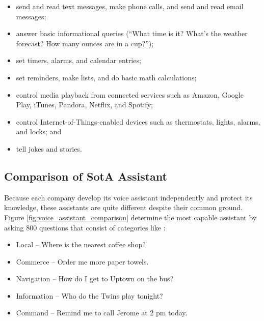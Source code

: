 \begin{itemize}
    \item send and read text messages, make phone calls, and send and read email messages; 
    \item answer basic informational queries (“What time is it? What’s the weather forecast? How many ounces are in a cup?”); 
    \item set timers, alarms, and calendar entries;
    \item set reminders, make lists, and do basic math calculations;
    \item control media playback from connected services such as Amazon, Google Play, iTunes, Pandora, Netflix, and Spotify; 
    \item control  Internet-of-Things-enabled  devices  such  as  thermostats,  lights, alarms, and locks; and 
    \item tell jokes and stories. 
\end{itemize}

\subsection{Comparison of SotA Assistant}

Because each company develop its voice assistant independently and protect its knowledge, these assistants are quite different despite their common ground. Figure \cref{fig:voice_assistant_comparison} determine the most capable assistant by asking 800 questions that consist of categories like \citep{voice_assistant_comparison_munster_2019}:

\begin{itemize}
    \item Local – Where is the nearest coffee shop?
    \item Commerce – Order me more paper towels.
    \item Navigation – How do I get to Uptown on the bus?
    \item Information – Who do the Twins play tonight?
    \item Command – Remind me to call Jerome at 2 pm today.
\end{itemize}

